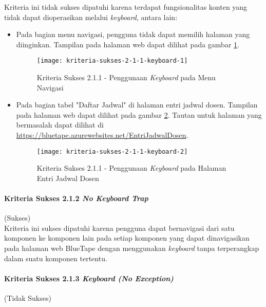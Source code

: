 Kriteria ini tidak sukses dipatuhi karena terdapat fungsionalitas konten yang tidak dapat dioperasikan melalui \textit{keyboard}, antara lain:

\begin{itemize}
    \item Pada bagian menu navigasi, pengguna tidak dapat memilih halaman yang diinginkan. Tampilan pada halaman web dapat dilihat pada gambar \ref{fig:2.1.1_keyboard_1}.
    \begin{figure}[H]
        \centering  
        \texttt{[image: kriteria-sukses-2-1-1-keyboard-1]}  
        \caption[Kriteria Sukses 2.1.1 - Penggunaan \textit{Keyboard} pada Menu Navigasi]{Kriteria Sukses 2.1.1 - Penggunaan \textit{Keyboard} pada Menu Navigasi}
        \label{fig:2.1.1_keyboard_1}  
    \end{figure} 

    \item Pada bagian tabel "Daftar Jadwal" di halaman entri jadwal dosen. Tampilan pada halaman web dapat dilihat pada gambar \ref{fig:2.1.1_keyboard_2}. Tautan untuk halaman yang bermasalah dapat dilihat di \url{https://bluetape.azurewebsites.net/EntriJadwalDosen}.
    \begin{figure}[H]
        \centering  
        \texttt{[image: kriteria-sukses-2-1-1-keyboard-2]}  
        \caption[Kriteria Sukses 2.1.1 - Penggunaan \textit{Keyboard} pada Halaman Entri Jadwal Dosen]{Kriteria Sukses 2.1.1 - Penggunaan \textit{Keyboard} pada Halaman Entri Jadwal Dosen}
        \label{fig:2.1.1_keyboard_2}  
    \end{figure} 
\end{itemize}

\paragraph{Kriteria Sukses 2.1.2 \textit{No Keyboard Trap}}
\label{par:kepatuhan_bluetape_kriteria_sukses_2.1.2}
(Sukses)\\

Kriteria ini sukses dipatuhi karena pengguna dapat bernavigasi dari satu komponen ke komponen lain pada setiap komponen yang dapat dinavigasikan pada halaman web BlueTape dengan menggunakan \textit{keyboard} tanpa terperangkap dalam suatu komponen tertentu.

\paragraph{Kriteria Sukses 2.1.3 \textit{Keyboard (No Exception)}}
\label{par:kepatuhan_bluetape_kriteria_sukses_2.1.3}
(Tidak Sukses)\\

